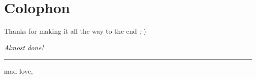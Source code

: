 %
\pagestyle{empty}
\hfill
\vfill
{}
\section*{Colophon}

{\Large Thanks for making it all the way to the end ;-)}


\bigskip

\begin{flushright}
        \begin{minipage}{5cm}
        		\emph{Almost done!}\\
                \rule{\textwidth}{1pt}
        		mad love, \\
                \thesisName
        \end{minipage}
\end{flushright}
